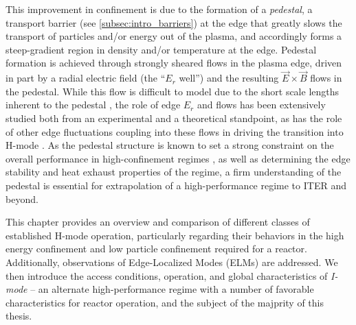This improvement in confinement is due to the formation of a \emph{pedestal}, a transport barrier (see \cref{subsec:intro_barriers}) at the edge that greatly slows the transport of particles and/or energy out of the plasma, and accordingly forms a steep-gradient region in density and/or temperature at the edge.  Pedestal formation is achieved through strongly sheared flows in the plasma edge, driven in part by a radial electric field (the ``$E_r$ well'') and the resulting $\vec{E} \times \vec{B}$ flows in the pedestal.  While this flow is difficult to model due to the short scale lengths inherent to the pedestal \cite{Kagan2010,Landreman2012}, the role of edge $E_r$ and flows has been extensively studied both from an experimental \cite{Groebner1990,Burrell1999,Terry2000,McDermott2009a} and a theoretical \cite{Shaing1989,Biglari1990,Kim1991,Ware1996,Burrell1992} standpoint, as has the role of other edge fluctuations coupling into these flows in driving the transition into H-mode \cite{Schmitz2012}.  As the pedestal structure is known to set a strong constraint on the overall performance in high-confinement regimes \cite{Kinsey2011}, as well as determining the edge stability and heat exhaust properties of the regime, a firm understanding of the pedestal is essential for extrapolation of a high-performance regime to ITER and beyond.

This chapter provides an overview and comparison of different classes of established H-mode operation, particularly regarding their behaviors in the high energy confinement and low particle confinement required for a reactor.  Additionally, observations of Edge-Localized Modes (ELMs) \cite{Zohm1996} are addressed.  We then introduce the access conditions, operation, and global characteristics of \emph{I-mode} -- an alternate high-performance regime with a number of favorable characteristics for reactor operation, and the subject of the majprity of this thesis.

